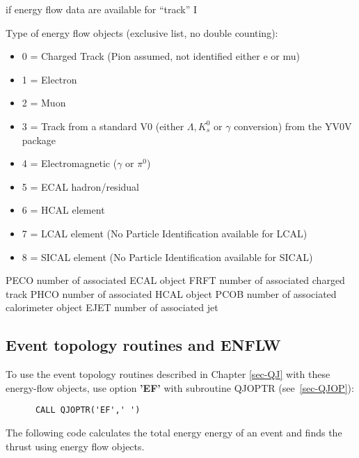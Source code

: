 \begin{indentlist}{ 3.00cm}{ 3.25cm}
 if energy flow 
data are available for ``track'' I


\newpage

Type of energy flow objects (exclusive list, no double counting):
\begin{itemize}
\item 0 = Charged Track (Pion assumed, not identified either e or mu) 
\item 1 = Electron
\item 2 = Muon
\item 3 = Track from a standard V0 (either $\Lambda, K^{0}_{s}$ or $\gamma$ conversion) from the YV0V package 
\item 4 = Electromagnetic ($\gamma$ or $\pi^{0}$)
\item 5 = ECAL hadron/residual
\item 6 = HCAL element
\item 7 = LCAL element (No Particle Identification available for LCAL)
\item 8 = SICAL element (No Particle Identification available for SICAL)
         
\end{itemize}
PECO number of associated ECAL object
FRFT number of associated charged track
PHCO number of associated HCAL object
PCOB number of associated calorimeter object
EJET number of associated jet
\end{indentlist}
\par

\subsection{\label{sec-EFLWT}Event topology routines and ENFLW}
To use the event topology routines described in
Chapter \ref{sec-QJ} with these energy-flow objects,
use option {\bf 'EF'} with subroutine QJOPTR
(see~\ref{sec-QJOP}):
\begin{verbatim}
      CALL QJOPTR('EF',' ')
\end{verbatim}
 
 
The following code calculates the total energy energy of an
event and finds the thrust using energy flow objects.
 
